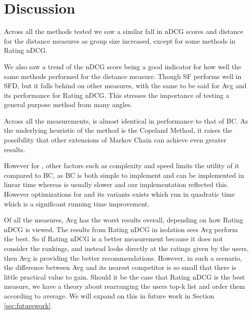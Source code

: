 \section{Discussion} \label{sec:discussion}

Across all the methods tested we saw a similar fall in nDCG scores and distance for the distance measures as group size increased, except for some methods in Rating nDCG.

We also saw a trend of the nDCG score being a good indicator for how well the same  methods performed for the distance measure. Though SF performs well in SFD, but it falls behind on other measures, with the same to be said for Avg and its performance for Rating nDCG. This stresses the importance of testing a general purpose method from many angles.

Across all the measurements, \MC is almost identical in performance to that of BC. As the underlying heuristic of the \MC method is the Copeland Method, it raises the possibility that other extensions of Markov Chain can achieve even greater results.

However for \MC, other factors such as complexity and speed limits the utility of it compared to BC, as BC is both simple to implement and can be implemented in linear time whereas \MC is usually slower and our implementation reflected this. However optimizations for \MC and its variants exists which run in quadratic time which is a significant running time improvement\cite{rank:aggregation}.

Of all the measures, Avg has the worst results overall, depending on how Rating nDCG is viewed. The results from Rating nDCG in isolation sees Avg perform the best. So if Rating nDCG is a better measurement because it does not consider the rankings, and instead looks directly at the ratings given by the users, then Avg is providing the better recommendations. However, in such a scenario, the difference between Avg and its nearest competitor is so small that there is little practical value to gain. Should it be the case that Rating nDCG is the best measure, we have a theory about rearranging the users top-k list and order them according to average. We will expand on this in future work in Section \ref{sec:futurework}.



